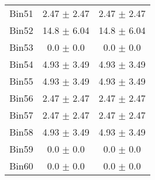 \begin{tabular}{|c|c|c|}
     Bin51 & 2.47 $\pm$ 2.47 & 2.47 $\pm$ 2.47 \\ \cline{1-3} 
     Bin52 & 14.8 $\pm$ 6.04 & 14.8 $\pm$ 6.04 \\ \cline{1-3} 
     Bin53 & 0.0 $\pm$ 0.0 & 0.0 $\pm$ 0.0 \\ \cline{1-3} 
     Bin54 & 4.93 $\pm$ 3.49 & 4.93 $\pm$ 3.49 \\ \cline{1-3} 
     Bin55 & 4.93 $\pm$ 3.49 & 4.93 $\pm$ 3.49 \\ \cline{1-3} 
     Bin56 & 2.47 $\pm$ 2.47 & 2.47 $\pm$ 2.47 \\ \cline{1-3} 
     Bin57 & 2.47 $\pm$ 2.47 & 2.47 $\pm$ 2.47 \\ \cline{1-3} 
     Bin58 & 4.93 $\pm$ 3.49 & 4.93 $\pm$ 3.49 \\ \cline{1-3} 
     Bin59 & 0.0 $\pm$ 0.0 & 0.0 $\pm$ 0.0 \\ \cline{1-3} 
     Bin60 & 0.0 $\pm$ 0.0 & 0.0 $\pm$ 0.0 \\ \cline{1-3} 
  \end{tabular}
